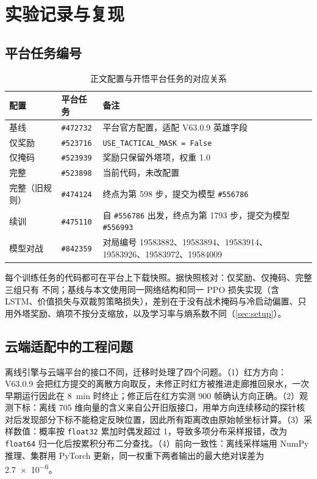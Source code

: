\section{实验记录与复现}
\label{sec:appendix}

\subsection{平台任务编号}

\begin{table}[htbp]
  \centering
  \caption{正文配置与开悟平台任务的对应关系}
  \label{tab:task-ids}
  \begin{tabularx}{\linewidth}{llX}
    \toprule
    配置 & 平台任务 & 备注 \\
    \midrule
    基线 & \texttt{\#472732} & 平台官方配置，适配 V63.0.9 英雄字段 \\
    仅奖励 & \texttt{\#523716} & \texttt{USE\_TACTICAL\_MASK = False} \\
    仅掩码 & \texttt{\#523939} & 奖励只保留外塔项，权重 \num{1.0} \\
    完整 & \texttt{\#523898} & 当前代码，未改配置 \\
    完整（旧规则） & \texttt{\#474124} & 终点为第 \num{598} 步，提交为模型 \texttt{\#556786} \\
    续训 & \texttt{\#475110} & 自 \texttt{\#556786} 出发，终点为第 \num{1793} 步，提交为模型 \texttt{\#556993} \\
    模型对战 & \texttt{\#842359} & 对局编号 19583882、19583894、19583914、19583926、19583972、19584009 \\
    \bottomrule
  \end{tabularx}
\end{table}

每个训练任务的代码都可在平台上下载快照。据快照核对：仅奖励、仅掩码、完整三组只有  不同；基线与本文使用同一网络结构和同一 PPO 损失实现（含 LSTM、价值损失与双裁剪策略损失），差别在于没有战术掩码与冷启动偏置、只用外塔奖励、熵项不按分支缩放，以及学习率与熵系数不同（\cref{sec:setup}）。

\subsection{云端适配中的工程问题}

离线引擎与云端平台的接口不同，迁移时处理了四个问题。（1）红方方向：V63.0.9 会把红方提交的离散方向取反，未修正时红方被推进走廊推回泉水，一次早期运行因此在 \qty{8}{\minute} 时终止；修正后在红方实测 \num{900} 帧确认方向正确。（2）观测下标：离线 \num{705} 维向量的含义来自公开旧版接口\cite{hoksource}，用单方向连续移动的探针核对后发现部分下标不能稳定反映位置，因此所有距离改由原始帧坐标计算。（3）采样数值：概率按 \texttt{float32} 累加时偶发超过 \num{1}，导致多项分布采样报错，改为 \texttt{float64} 归一化后按累积分布二分查找。（4）前向一致性：离线采样端用 NumPy 推理、集群用 PyTorch 更新，同一权重下两者输出的最大绝对误差为 \num{2.7e-6}。

